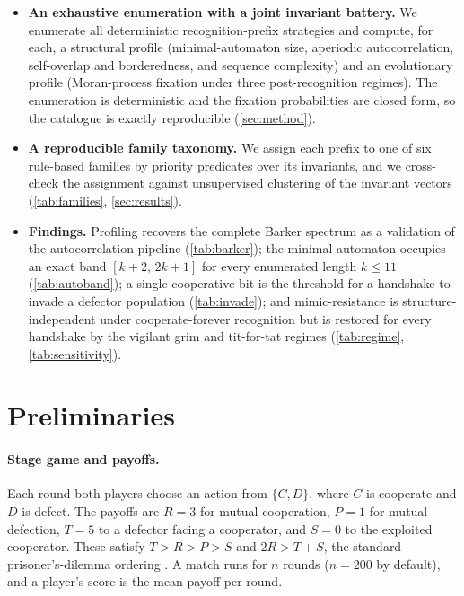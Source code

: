 \begin{itemize}
  \item \textbf{An exhaustive enumeration with a joint invariant battery.} We
    enumerate all deterministic recognition-prefix strategies and compute, for
    each, a structural profile (minimal-automaton size, aperiodic
    autocorrelation, self-overlap and borderedness, and sequence complexity) and
    an evolutionary profile (Moran-process fixation under three post-recognition
    regimes). The enumeration is deterministic and the fixation probabilities are
    closed form, so the catalogue is exactly reproducible
    (\cref{sec:method}).
  \item \textbf{A reproducible family taxonomy.} We assign each prefix to one of
    six rule-based families by priority predicates over its invariants, and we
    cross-check the assignment against unsupervised clustering of the invariant
    vectors (\cref{tab:families}, \cref{sec:results}).
  \item \textbf{Findings.} Profiling recovers the complete Barker spectrum as a
    validation of the autocorrelation pipeline (\cref{tab:barker}); the minimal
    automaton occupies an exact band $[k+2,\,2k+1]$ for every enumerated length
    $k\le 11$ (\cref{tab:autoband}); a
    single cooperative bit is the threshold for a handshake to invade a defector
    population (\cref{tab:invade}); and mimic-resistance is structure-independent
    under cooperate-forever recognition but is restored for every handshake by the
    vigilant grim and tit-for-tat regimes (\cref{tab:regime},
    \cref{tab:sensitivity}).
\end{itemize}

\section{Preliminaries}
\label{sec:prelim}

\paragraph{Stage game and payoffs.}
Each round both players choose an action from $\{C,D\}$, where $C$ is cooperate
and $D$ is defect. The payoffs are $R=3$ for mutual cooperation, $P=1$ for mutual
defection, $T=5$ to a defector facing a cooperator, and $S=0$ to the exploited
cooperator. These satisfy $T>R>P>S$ and $2R>T+S$, the standard prisoner's-dilemma
ordering \citep{axelrod1984}. A match runs for $n$ rounds ($n=200$ by default),
and a player's score is the mean payoff per round.

